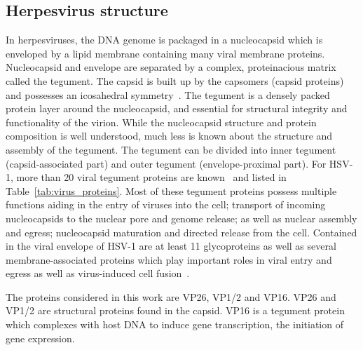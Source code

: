 \pagebreak

\subsection{Herpesvirus structure}
In herpesviruses, the DNA genome is packaged in a nucleocapsid which is enveloped by a lipid membrane containing many viral membrane proteins.
Nucleocapsid and envelope are separated by a complex, proteinacious matrix called the tegument.
The \gls{capsid} is built up by the capsomers (capsid proteins) and possesses an icosahedral symmetry~\cite{bainesHerpesSimplexVirus2011}.
The tegument is a densely packed protein layer around the nucleocapsid, and essential for structural integrity and functionality of the virion.
While the nucleocapsid structure and protein composition is well understood, much less is known about the structure and assembly of the tegument.
The tegument can be divided into inner tegument (capsid-associated part) and outer tegument (envelope-proximal part).
For HSV-1, more than 20 viral tegument proteins are known~\cite{kellyFunctionalRolesTegument2009,maxwellViralProteomics2007} and listed in Table~\ref{tab:virus_proteins}.
Most of these tegument proteins possess multiple functions aiding in the entry of viruses into the cell; transport of incoming nucleocapsids to the nuclear pore and genome release; as well as nuclear assembly and egress; nucleocapsid maturation and directed release from the cell.
Contained in the viral envelope of \gls{HSV}-1 are at least 11 glycoproteins as well as several membrane-associated proteins which play important roles in viral entry and egress as well as virus-induced cell fusion~\cite{reskeUnderstandingHSV1Entry2007,johnsonHerpesvirusesRemodelHost2011}.

The proteins considered in this work are \gls{VP26}, \gls{VP1/2} and \gls{VP16}.
\gls{VP26}\cite{tangCrystalStructuresMajor2007} and \gls{VP1/2} are structural proteins found in the capsid.
\gls{VP16} is a tegument protein which complexes with host DNA to induce gene transcription, the initiation of gene expression.

